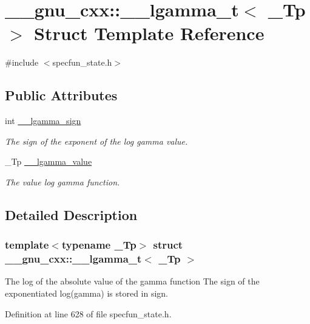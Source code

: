 \hypertarget{struct____gnu__cxx_1_1____lgamma__t}{}\section{\+\_\+\+\_\+gnu\+\_\+cxx\+:\+:\+\_\+\+\_\+lgamma\+\_\+t$<$ \+\_\+\+Tp $>$ Struct Template Reference}
\label{struct____gnu__cxx_1_1____lgamma__t}


{\ttfamily \#include $<$specfun\+\_\+state.\+h$>$}

\subsection*{Public Attributes}
\begin{DoxyCompactItemize}
\item 
int \hyperlink{struct____gnu__cxx_1_1____lgamma__t_a8aecdc9e5f69e729e96dc50f0c57b331}{\+\_\+\+\_\+lgamma\+\_\+sign}
\begin{DoxyCompactList}\small\item\em The sign of the exponent of the log gamma value. \end{DoxyCompactList}\item 
\+\_\+\+Tp \hyperlink{struct____gnu__cxx_1_1____lgamma__t_a916af5560acafd8dcf25c42fd28deef5}{\+\_\+\+\_\+lgamma\+\_\+value}
\begin{DoxyCompactList}\small\item\em The value log gamma function. \end{DoxyCompactList}\end{DoxyCompactItemize}


\subsection{Detailed Description}
\subsubsection*{template$<$typename \+\_\+\+Tp$>$\newline
struct \+\_\+\+\_\+gnu\+\_\+cxx\+::\+\_\+\+\_\+lgamma\+\_\+t$<$ \+\_\+\+Tp $>$}

The log of the absolute value of the gamma function The sign of the exponentiated log(gamma) is stored in sign. 

Definition at line 628 of file specfun\+\_\+state.\+h.



